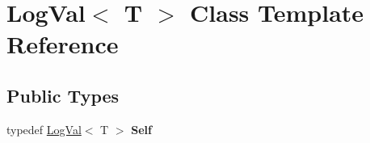\hypertarget{class_log_val}{}\section{Log\+Val$<$ T $>$ Class Template Reference}
\label{class_log_val}
\subsection*{Public Types}
\begin{DoxyCompactItemize}
\item 
\mbox{\label{class_log_val_a3af99df19f5c5ab8366212b74794d51b}} 
typedef \mbox{\hyperlink{class_log_val}{Log\+Val}}$<$ T $>$ {\bfseries Self}
\end{DoxyCompactItemize}
